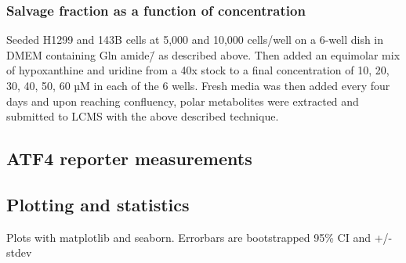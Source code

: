 \subsubsection{Salvage fraction as a function of concentration}
Seeded H1299 and 143B cells at 5,000 and 10,000 cells/well on a 6-well dish in DMEM containing Gln amide\=/\hNi{} as described above.
Then added an equimolar mix of hypoxanthine and uridine from a 40x stock to a final concentration of 10, 20, 30, 40, 50, 60 µM in each of the 6 wells.
Fresh media was then added every four days and upon reaching confluency, polar metabolites were extracted and submitted to LCMS with the above described technique.






\subsection{ATF4 reporter measurements}




\subsection{Plotting and statistics}
Plots with matplotlib and seaborn.
Errorbars are bootstrapped 95\% CI and +/- stdev








